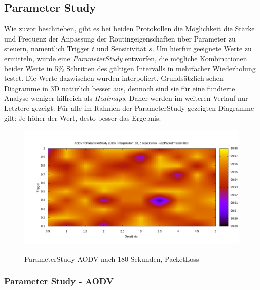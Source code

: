 \subsection{Parameter Study}
\label{chapter:auswertung:study}

Wie zuvor beschrieben, gibt es bei beiden Protokollen die Möglichkeit die Stärke und Frequenz der Anpassung der Routingeigenschaften über Parameter zu steuern, namentlich Trigger $t$ und Sensitivität $s$. Um hierfür geeignete Werte zu ermitteln, wurde eine \textit{ParameterStudy} entworfen, die mögliche Kombinationen beider Werte in 5\% Schritten des gültigen Intervalls in mehrfacher Wiederholung testet. Die Werte dazwischen wurden interpoliert. Grundsätzlich sehen Diagramme in 3D natürlich besser aus, dennoch sind sie für eine fundierte Analyse weniger hilfreich als \textit{Heatmaps}. Daher werden im weiteren Verlauf nur Letztere gezeigt. Für alle im Rahmen der ParameterStudy gezeigten Diagramme gilt: Je höher der Wert, desto besser das Ergebnis.


\begin{figure}
  \centering
  \includegraphics[scale=0.45]{bilder/aps2.png} \\
  \caption{ParameterStudy AODV nach 180 Sekunden, PacketLoss}
  \label{image:omnet:aodv:two}
\end{figure}

\subsubsection{Parameter Study - AODV}
\label{chapter:auswertung:studyaodv}

